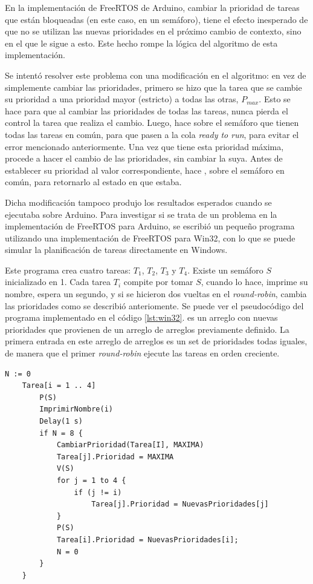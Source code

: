 	En la implementación de FreeRTOS de Arduino, cambiar la prioridad de tareas que están bloqueadas (en este caso, en un semáforo), tiene el efecto inesperado de que no se utilizan las nuevas prioridades en el próximo cambio de contexto, sino en el que le sigue a esto. Este hecho rompe la lógica del algoritmo de esta implementación.

	Se intentó resolver este problema con una modificación en el algoritmo: en vez de simplemente cambiar las prioridades, primero se hizo que la tarea que se cambie su prioridad a una prioridad mayor (estricto) a todas las otras, $P_{max}$.
	Esto se hace para que al cambiar las prioridades de todas las tareas, nunca pierda el control la tarea que realiza el cambio.
	Luego, hace  sobre el semáforo que tienen todas las tareas en común, para que pasen a la cola \emph{ready to run}, para evitar el error mencionado anteriormente.
	Una vez que tiene esta prioridad máxima, procede a hacer el cambio de las prioridades, sin cambiar la suya.
	Antes de establecer su prioridad al valor correspondiente, hace , sobre el semáforo en común, para retornarlo al estado en que estaba.

	Dicha modificación tampoco produjo los resultados esperados cuando se ejecutaba sobre Arduino.
	Para investigar si se trata de un problema en la implementación de FreeRTOS para Arduino, se escribió un pequeño programa utilizando una implementación de FreeRTOS para Win32, con lo que se puede simular la planificación de tareas directamente en Windows.

	Este programa crea cuatro tareas: $T_1$, $T_2$, $T_3$ y $T_4$. Existe un semáforo $S$ inicializado en 1.
	Cada tarea $T_i$ compite por tomar $S$, cuando lo hace, imprime su nombre, espera un segundo, y si se hicieron dos vueltas en el \emph{round-robin}, cambia las prioridades como se describió anteriomente. Se puede ver el pseudocódigo del programa implementado en el código \ref{lst:win32}.  es un arreglo con nuevas prioridades que provienen de un arreglo de arreglos previamente definido. La primera entrada en este arreglo de arreglos es un set de prioridades todas iguales, de manera que el primer \emph{round-robin} ejecute las tareas en orden creciente.

	\begin{lstlisting}[float, label=lst:win32, caption=Pseudocódigo del programa escrito para FreeRTOS-Win32.]
	N := 0
	Tarea[i = 1 .. 4]
		P(S)
		ImprimirNombre(i)
		Delay(1 s)
		if N = 8 {
			CambiarPrioridad(Tarea[I], MAXIMA)
			Tarea[j].Prioridad = MAXIMA
			V(S)
			for j = 1 to 4 {
				if (j != i)
					Tarea[j].Prioridad = NuevasPrioridades[j]
			}
			P(S)
			Tarea[i].Prioridad = NuevasPrioridades[i];
			N = 0
		}
	}
	\end{lstlisting}

